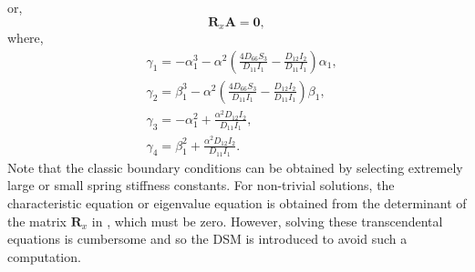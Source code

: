 \documentclass[preprint,12pt]{elsarticle}
\begin{document}
%
or,
%
\begin{equation}\label{eq:ABx1}
		\mathbf{R}_x \mathbf{A} = \mathbf{0},
\end{equation}
%
where,
%
\begin{equation}\label{eq:gamma}
	\begin{split}
		&\gamma_1 = -\alpha_1^3 - \alpha^2 \left( \frac{4D_{66}S_3}{D_{11}I_1} - \frac{D_{12}I_2}{D_{11}I_1} \right) \alpha_1, \\
		&\gamma_2 = \beta_1^3 - \alpha^2 \left( \frac{4D_{66}S_3}{D_{11}I_1} - \frac{D_{12}I_2}{D_{11}I_1} \right) \beta_1, \\
		&\gamma_3 = -\alpha_1^2 + \frac{\alpha^2 D_{12} I_2}{D_{11} I_1}, \\
		&\gamma_4 = \beta_1^2 + \frac{\alpha^2 D_{12} I_2}{D_{11} I_1}.
	\end{split}
\end{equation}
%
Note that the classic boundary conditions can be obtained by selecting extremely large or small spring stiffness constants.
For non-trivial solutions, the characteristic equation or eigenvalue equation is obtained from the determinant of the matrix $\mathbf{R}_x$ in , which must be zero.
However, solving these transcendental equations is cumbersome and so the DSM is introduced to avoid such a computation.
\end{document}
